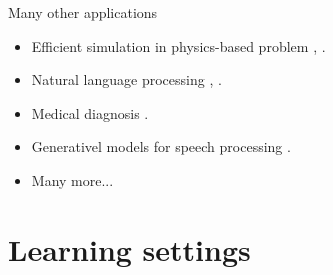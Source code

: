 \documentclass[xcolor={usenames,dvipsnames},handout]{beamer}
\begin{document}
\begin{frame}{Many other applications}
\begin{itemize}  
\item Efficient simulation in physics-based problem {\tiny \href{http://proceedings.mlr.press/v70/tompson17a/tompson17a.pdf}{},  \href{https://www.sciencedirect.com/science/article/abs/pii/S0378778821005028}{}}.

\vspace{.2cm}

\item Natural language processing {\tiny \href{https://proceedings.mlr.press/v48/kumar16.html}{}}, {\tiny \href{https://openai.com/blog/dall-e/}{}}.

\vspace{.2cm}

\item Medical diagnosis {\tiny \href{https://www.nature.com/articles/s41467-020-17419-7?6598}{}}.

\vspace{.2cm}

\item Generativel models for speech processing {\tiny \href{https://arxiv.org/abs/1609.03499}{}}.

\vspace{.2cm}

\item Many more...

\end{itemize}
\end{frame}

\section{Learning settings}
\end{document}
